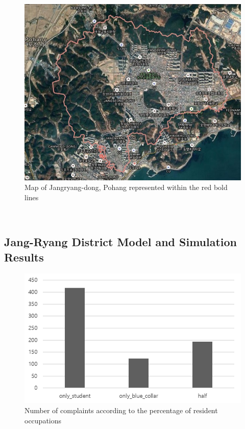 \documentclass{scsSimAUDPaperFormat}
\begin{document}
\begin{figure}[!h]
    \centering
    \includegraphics[width=1.0\columnwidth]{fig/map.jpg}
    \caption{Map of Jangryang-dong, Pohang represented within the red bold lines}
    \label{Fig:JangYrang}
\end{figure}


\\
\subsection{Jang-Ryang District Model and Simulation Results}

\begin{figure}[!h]
    \centering
    \includegraphics[width=1.0\columnwidth]{fig/case_study_result.png}
    \caption{Number of complaints according to the percentage of resident occupations}
    \label{Fig:case_result}
\end{figure}
\end{document}
